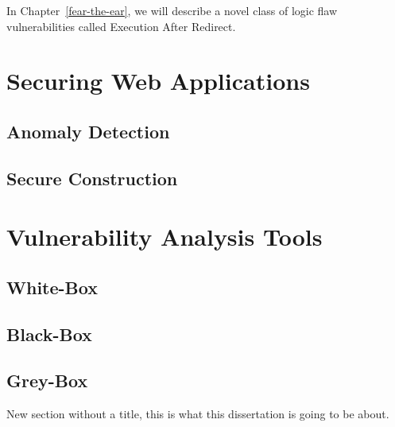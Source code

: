 In Chapter~\ref{fear-the-ear}, we will describe a novel class of logic
flaw vulnerabilities called Execution After Redirect.

\section{Securing Web Applications}

\subsection{Anomaly Detection}

\subsection{Secure Construction}

\section{Vulnerability Analysis Tools}

\subsection{White-Box}

\subsection{Black-Box}

\subsection{Grey-Box}



New section without a title, this is what this dissertation is going
to be about.







